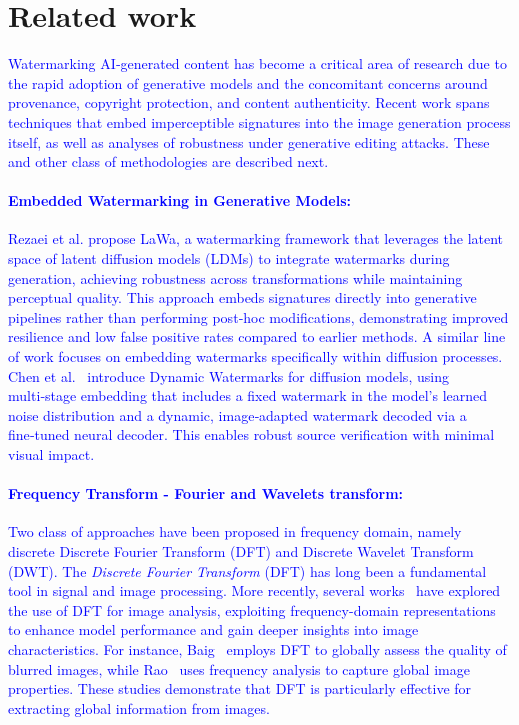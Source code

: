 \section{Related work}
\label{sec:rel_work}

\textcolor{blue}{
Watermarking AI‑generated content has become a critical area of research due to the rapid adoption of generative models and the concomitant concerns around provenance, copyright protection, and content authenticity. Recent work spans techniques that embed imperceptible signatures into the image generation process itself, as well as analyses of robustness under generative editing attacks. These and other class of methodologies are described next.}

\textcolor{blue}{
\paragraph{Embedded Watermarking in Generative Models:}
Rezaei et al.\cite{rezaei2024lawa} propose LaWa, a watermarking framework that leverages the latent space of latent diffusion models (LDMs) to integrate watermarks during generation, achieving robustness across transformations while maintaining perceptual quality. This approach embeds signatures directly into generative pipelines rather than performing post‑hoc modifications, demonstrating improved resilience and low false positive rates compared to earlier methods. 
A similar line of work focuses on embedding watermarks specifically within diffusion processes. Chen et al.~\cite{chen2025tagwm} introduce Dynamic Watermarks for diffusion models, using multi‑stage embedding that includes a fixed watermark in the model’s learned noise distribution and a dynamic, image‑adapted watermark decoded via a fine‑tuned neural decoder. This enables robust source verification with minimal visual impact. 
}

\textcolor{blue}{
\paragraph{Frequency Transform - Fourier and Wavelets transform:}
Two class of approaches have been proposed in frequency domain, namely discrete Discrete Fourier Transform (DFT) and Discrete Wavelet Transform (DWT). The {\it Discrete Fourier Transform} (DFT) has long been a fundamental tool in signal and image processing. More recently, several works~\cite{jia2023fourier,jiang2021focal, rao2021global, yu2022deep} have explored the use of DFT for image analysis, exploiting frequency-domain representations to enhance model performance and gain deeper insights into image characteristics. For instance, Baig~\cite{baig2022dft} employs DFT to globally assess the quality of blurred images, while Rao~\cite{radha2024deep} uses frequency analysis to capture global image properties. These studies demonstrate that DFT is particularly effective for extracting global information from images. 
}

